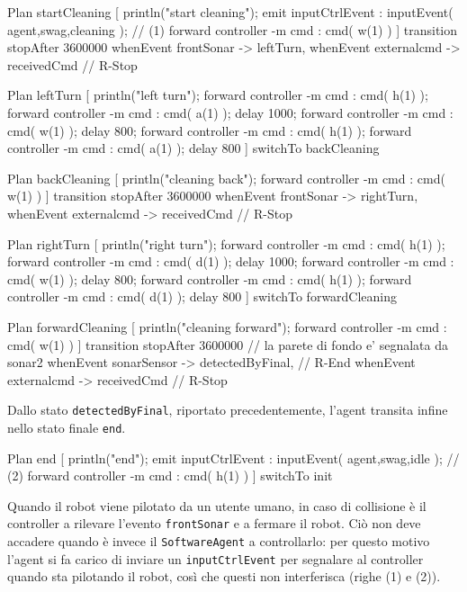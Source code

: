 \documentclass{../llncs}
\newcommand{\codescript}[1]{{\mbox{\small{\texttt{#1}}}}\xspace}
\begin{document}
\begin{qacode}[caption={SoftwareAgent, pt5}]
Plan startCleaning [
	println("start cleaning");
	emit inputCtrlEvent : inputEvent( agent,swag,cleaning ); // (1)
	forward controller -m cmd : cmd( w(1) )
]
transition stopAfter 3600000
	whenEvent frontSonar -> leftTurn,
	whenEvent externalcmd -> receivedCmd // R-Stop
	
Plan leftTurn [
	println("left turn");	
	forward controller -m cmd : cmd( h(1) );
	forward controller -m cmd : cmd( a(1) );
	delay 1000;
	forward controller -m cmd : cmd( w(1) );
	delay 800;
	forward controller -m cmd : cmd( h(1) );
	forward controller -m cmd : cmd( a(1) );
	delay 800
]
switchTo backCleaning

Plan backCleaning [
	println("cleaning back");
	forward controller -m cmd : cmd( w(1) )
]
transition stopAfter 3600000
	whenEvent frontSonar -> rightTurn,
	whenEvent externalcmd -> receivedCmd // R-Stop
	
Plan rightTurn [
	println("right turn");
	forward controller -m cmd : cmd( h(1) );
	forward controller -m cmd : cmd( d(1) );
	delay 1000;
	forward controller -m cmd : cmd( w(1) );
	delay 800;
	forward controller -m cmd : cmd( h(1) );
	forward controller -m cmd : cmd( d(1) );
	delay 800
]
switchTo forwardCleaning

Plan forwardCleaning [
	println("cleaning forward");
	forward controller -m cmd : cmd( w(1) )
]
transition stopAfter 3600000
	// la parete di fondo e' segnalata da sonar2
	whenEvent sonarSensor -> detectedByFinal, // R-End
	whenEvent externalcmd -> receivedCmd // R-Stop
\end{qacode}

Dallo stato \codescript{detectedByFinal}, riportato precedentemente, l'agent transita infine nello stato finale \codescript{end}.\\

\begin{qacode}[caption={SoftwareAgent, pt5}]
Plan end [
	println("end");
	emit inputCtrlEvent : inputEvent( agent,swag,idle ); // (2)
	forward controller -m cmd : cmd( h(1) )
]
switchTo init
\end{qacode}

Quando il robot viene pilotato da un utente umano, in caso di collisione è il controller a rilevare l'evento \codescript{frontSonar} e a fermare il robot. Ciò non deve accadere quando è invece il \texttt{SoftwareAgent} a controllarlo: per questo motivo l'agent si fa carico di inviare un \codescript{inputCtrlEvent} per segnalare al controller quando sta pilotando il robot, così che questi non interferisca (righe (1) e (2)).
\end{document}
